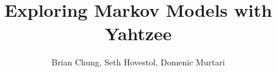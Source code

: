 \documentclass[12pt]{article}
\begin{document}
\title{Exploring Markov Models with Yahtzee}
\author{Brian Chung, Seth Hovestol, Domenic Murtari}
\maketitle










\end{document}
